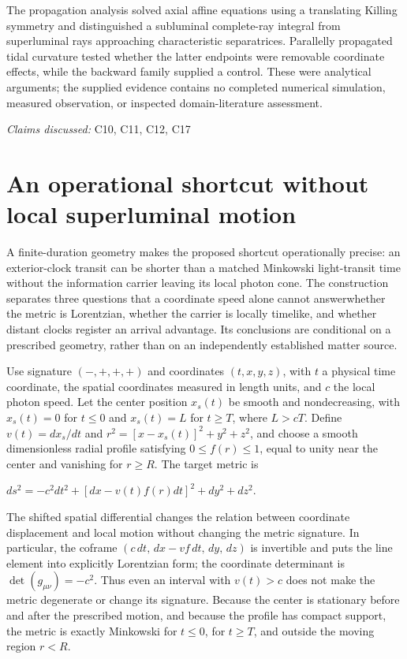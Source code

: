 \documentclass[11pt]{article}
\begin{document}
The propagation analysis solved axial affine equations using a translating Killing symmetry and distinguished a subluminal complete-ray integral from superluminal rays approaching characteristic separatrices. Parallelly propagated tidal curvature tested whether the latter endpoints were removable coordinate effects, while the backward family supplied a control. These were analytical arguments; the supplied evidence contains no completed numerical simulation, measured observation, or inspected domain-literature assessment.

\textit{Claims discussed: }C10, C11, C12, C17
\section{An operational shortcut without local superluminal motion}
A finite-duration geometry makes the proposed shortcut operationally precise: an exterior-clock transit can be shorter than a matched Minkowski light-transit time without the information carrier leaving its local photon cone. The construction separates three questions that a coordinate speed alone cannot answer\textemdash{}whether the metric is Lorentzian, whether the carrier is locally timelike, and whether distant clocks register an arrival advantage. Its conclusions are conditional on a prescribed geometry, rather than on an independently established matter source.

Use signature $(-,+,+,+)$ and coordinates $(t,x,y,z)$, with $t$ a physical time coordinate, the spatial coordinates measured in length units, and $c$ the local photon speed. Let the center position $x_s(t)$ be smooth and nondecreasing, with $x_s(t)=0$ for $t\leq 0$ and $x_s(t)=L$ for $t\geq T$, where $L>cT$. Define $v(t)=dx_s/dt$ and $r^2=[x-x_s(t)]^2+y^2+z^2$, and choose a smooth dimensionless radial profile satisfying $0\leq f(r)\leq 1$, equal to unity near the center and vanishing for $r\geq R$. The target metric is

$ds^2=-c^2dt^2+[dx-v(t)f(r)dt]^2+dy^2+dz^2.$

The shifted spatial differential changes the relation between coordinate displacement and local motion without changing the metric signature. In particular, the coframe $(c\,dt,\,dx-vf\,dt,\,dy,\,dz)$ is invertible and puts the line element into explicitly Lorentzian form; the coordinate determinant is $\det(g_{\mu\nu})=-c^2$. Thus even an interval with $v(t)>c$ does not make the metric degenerate or change its signature. Because the center is stationary before and after the prescribed motion, and because the profile has compact support, the metric is exactly Minkowski for $t\leq 0$, for $t\geq T$, and outside the moving region $r<R$.
\end{document}

